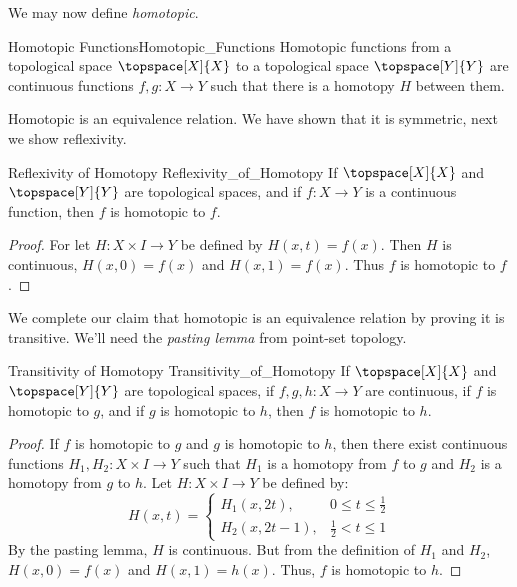 \documentclass{book}                                                           %
\begin{document}
                We may now define \textit{homotopic}.
                \begin{fdefinition}{Homotopic Functions}{Homotopic_Functions}
                    Homotopic functions from a topological space
                    $\topspace[X]{X}$ to a topological space $\topspace[Y]{Y}$
                    are continuous functions $f,g:{X}\rightarrow{Y}$ such that
                    there is a homotopy $H$ between them.
                \end{fdefinition}
                Homotopic is an equivalence relation. We have shown that it is
                symmetric, next we show reflexivity.
                \begin{ltheorem}{Reflexivity of Homotopy}
                                {Reflexivity_of_Homotopy}
                    If $\topspace[X]{X}$ and $\topspace[Y]{Y}$ are topological
                    spaces, and if $f:X\rightarrow{Y}$ is a continuous function,
                    then $f$ is homotopic to $f$.
                \end{ltheorem}
                \begin{proof}
                    For let $H:X\times{I}\rightarrow{Y}$ be defined by
                    $H(x,t)=f(x)$. Then $H$ is continuous, $H(x,0)=f(x)$ and
                    $H(x,1)=f(x)$. Thus $f$ is homotopic to $f$.
                \end{proof}
                We complete our claim that homotopic is an equivalence relation
                by proving it is transitive. We'll need the
                \textit{pasting lemma} from point-set topology.
                \begin{ltheorem}{Transitivity of Homotopy}
                                {Transitivity_of_Homotopy}
                    If $\topspace[X]{X}$ and $\topspace[Y]{Y}$ are topological
                    spaces, if $f,g,h:X\rightarrow{Y}$ are continuous, if $f$ is
                    homotopic to $g$, and if $g$ is homotopic to $h$, then $f$
                    is homotopic to $h$.
                \end{ltheorem}
                \begin{proof}
                    If $f$ is homotopic to $g$ and $g$ is homotopic to $h$, then
                    there exist continuous functions
                    $H_{1},H_{2}:X\times{I}\rightarrow{Y}$ such that $H_{1}$ is
                    a homotopy from $f$ to $g$ and $H_{2}$ is a homotopy from
                    $g$ to $h$. Let $H:X\times{I}\rightarrow{Y}$ be defined by:
                    \begin{equation}
                        H(x,t)=
                        \begin{cases}
                            H_{1}(x,2t),&{0}\leq{t}\leq\frac{1}{2}\\
                            H_{2}(x,2t-1),&\frac{1}{2}<{t}\leq{1}
                        \end{cases}
                    \end{equation}
                    By the pasting lemma, $H$ is continuous. But from the
                    definition of $H_{1}$ and $H_{2}$, $H(x,0)=f(x)$ and
                    $H(x,1)=h(x)$. Thus, $f$ is homotopic to $h$.
                \end{proof}
\end{document}
